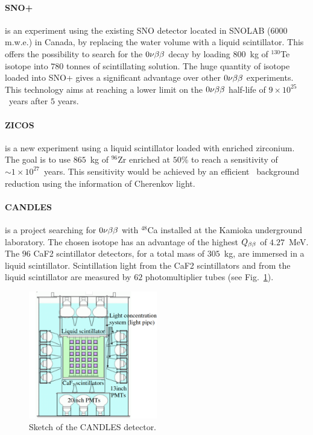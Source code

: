 \paragraph{SNO+} is an experiment using the existing SNO detector located in SNOLAB ($6000$ m.w.e.) in Canada, by replacing the water volume with a liquid scintillator.
This offers the possibility to search for the $0\nu\beta\beta$ decay by loading $800$~kg of $^{130}$Te isotope into $780$ tonnes of scintillating solution.
The huge quantity of isotope loaded into SNO+ gives a significant advantage over other $0\nu\beta\beta$ experiments.
This technology aims at reaching a lower limit on the $0\nu\beta\beta$ half-life of $9 \times 10^{25}$~years after $5$ years.


\paragraph{ZICOS} is a new experiment using a liquid scintillator loaded with enriched zirconium.
The goal is to use $865$~kg of $^{96}$Zr enriched at $50$\% to reach a sensitivity of $\sim 1\times 10^{27}$~years.
This sensitivity would be achieved by an efficient \Tl\ background reduction using the information of Cherenkov light.

\paragraph{CANDLES} is a project searching for $0\nu\beta\beta$ with $^{48}$Ca installed at the Kamioka underground laboratory.
The chosen isotope has an advantage of the highest $Q_{\beta\beta}$ of $4.27$~MeV.
The $96$ CaF2 scintillator detectors, for a total mass of $305$~kg, are immersed in a liquid scintillator.
Scintillation light from the CaF2 scintillators and from the liquid scintillator are measured by $62$ photomultiplier tubes (see Fig.~\ref{fig:CANDLES}).

\begin{figure}
  \centering
  \includegraphics[width=0.5\textwidth]{neutrinophysics/fig_neutrinophysics/CANDLES.pdf}
  \caption{Sketch of the CANDLES detector.
    \label{fig:CANDLES}}
\end{figure}


